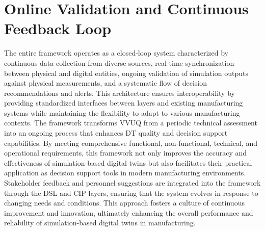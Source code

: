 \section{Online Validation and Continuous Feedback Loop}
\label{sec:online-validation}
The entire framework operates as a closed-loop system characterized by continuous data collection from diverse sources, real-time synchronization between physical and digital entities, ongoing validation of simulation outputs against physical measurements, and a systematic flow of decision recommendations and alerts. This architecture ensures interoperability by providing standardized interfaces between layers and existing manufacturing systems while maintaining the flexibility to adapt to various manufacturing contexts. The framework transforms VVUQ from a periodic technical assessment into an ongoing process that enhances DT quality and decision support capabilities. By meeting comprehensive functional, non-functional, technical, and operational requirements, this framework not only improves the accuracy and effectiveness of simulation-based digital twins but also facilitates their practical application as decision support tools in modern manufacturing environments. Stakeholder feedback and personnel suggestions are integrated into the framework through the DSL and CIP layers, ensuring that the system evolves in response to changing needs and conditions. This approach fosters a culture of continuous improvement and innovation, ultimately enhancing the overall performance and reliability of simulation-based digital twins in manufacturing.

